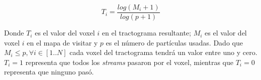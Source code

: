 $$ T_i = \frac{ log(M_i + 1)}{log(p+1)} $$

Donde $T_i$ es el valor del voxel $i$ en el tractograma resultante; $M_i$ es 
el valor del voxel $i$ en el mapa de visitar y $p$ es el n\'umero de part\'iculas
usadas. Dado que $M_i \leq p, \forall i \in [1..N]$ cada voxel del tractograma tendr\'a un 
valor entre uno y cero. $T_i = 1$ representa que todos los \textit{streams} pasaron 
por el voxel, mientras que $T_i = 0$ representa que ninguno pas\'o. \\









